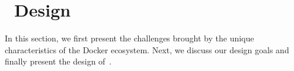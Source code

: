 \section{\sysname~Design}
\label{sec:slimmer}

%




In this section, we first present the challenges brought by the unique characteristics of the Docker ecosystem.
Next, we discuss our design goals and finally present the design of~\sysname. 






